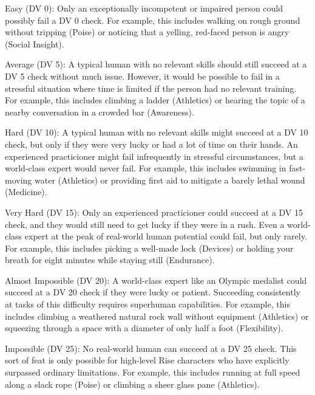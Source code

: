     \begin{raggeditemize}
      \item Easy (DV 0): Only an exceptionally incompetent or impaired person could possibly fail a DV 0 check. For example, this includes walking on rough ground without tripping (Poise) or noticing that a yelling, red-faced person is angry (Social Insight).
      \item Average (DV 5): A typical human with no relevant skills should still succeed at a DV 5 check without much issue. However, it would be possible to fail in a stressful situation where time is limited if the person had no relevant training. For example, this includes climbing a ladder (Athletics) or hearing the topic of a nearby conversation in a crowded bar (Awareness).
      \item Hard (DV 10): A typical human with no relevant skills might succeed at a DV 10 check, but only if they were very lucky or had a lot of time on their hands. An experienced practicioner might fail infrequently in stressful circumstances, but a world-class expert would never fail. For example, this includes swimming in fast-moving water (Athletics) or providing first aid to mitigate a barely lethal wound (Medicine).
      \item Very Hard (DV 15): Only an experienced practicioner could succeed at a DV 15 check, and they would still need to get lucky if they were in a rush. Even a world-class expert at the peak of real-world human potential could fail, but only rarely. For example, this includes picking a well-made lock (Devices) or holding your breath for eight minutes while staying still (Endurance).
      \item Almost Impossible (DV 20): A world-class expert like an Olympic medalist could succeed at a DV 20 check if they were lucky or patient. Succeeding consistently at tasks of this difficulty requires superhuman capabilities. For example, this includes climbing a weathered natural rock wall without equipment (Athletics) or squeezing through a space with a diameter of only half a foot (Flexibility).
      \item Impossible (DV 25\add): No real-world human can succeed at a DV 25 check. This sort of feat is only possible for high-level Rise characters who have explicitly surpassed ordinary limitations. For example, this includes running at full speed along a slack rope (Poise) or climbing a sheer glass pane (Athletics).
    \end{raggeditemize}

